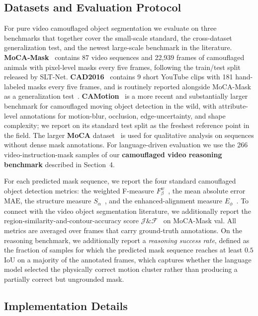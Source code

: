 \documentclass[11pt]{article}
\begin{document}
\subsection{Datasets and Evaluation Protocol}

For pure video camouflaged object segmentation we evaluate on three benchmarks that together cover the small-scale standard, the cross-dataset generalization test, and the newest large-scale benchmark in the literature.
\textbf{MoCA-Mask}~\cite{sltnet} contains 87 video sequences and 22{,}939 frames of camouflaged animals with pixel-level masks every five frames, following the train/test split released by SLT-Net.
\textbf{CAD2016}~\cite{cad2016} contains 9 short YouTube clips with 181 hand-labeled masks every five frames, and is routinely reported alongside MoCA-Mask as a generalization test~\cite{sltnet,emip}.
\textbf{CAMotion}~\cite{camotion} is a more recent and substantially larger benchmark for camouflaged moving object detection in the wild, with attribute-level annotations for motion-blur, occlusion, edge-uncertainty, and shape complexity; we report on its standard test split as the freshest reference point in the field.
The larger \textbf{MoCA} dataset~\cite{moca} is used for qualitative analysis on sequences without dense mask annotations.
For language-driven evaluation we use the 266 video-instruction-mask samples of our \textbf{camouflaged video reasoning benchmark} described in Section~4.

For each predicted mask sequence, we report the four standard camouflaged object detection metrics: the weighted F-measure $F^w_\beta$~\cite{margolinFW}, the mean absolute error $\mathrm{MAE}$, the structure measure $S_\alpha$~\cite{salphaR}, and the enhanced-alignment measure $E_\phi$~\cite{ephiR}.
To connect with the video object segmentation literature, we additionally report the region-similarity-and-contour-accuracy score $\mathcal{J}\&\mathcal{F}$~\cite{davis} on MoCA-Mask val.
All metrics are averaged over frames that carry ground-truth annotations.
On the reasoning benchmark, we additionally report a \emph{reasoning success rate}, defined as the fraction of samples for which the predicted mask sequence reaches at least $0.5$ IoU on a majority of the annotated frames, which captures whether the language model selected the physically correct motion cluster rather than producing a partially correct but ungrounded mask.

\subsection{Implementation Details}
\end{document}

